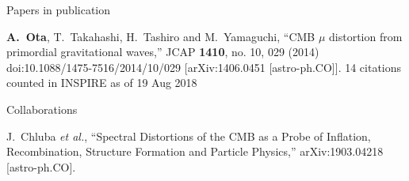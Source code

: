 \documentclass[a4paper]{resume} %
\begin{document}
\begin{rSection}{Papers in publication}
\begin{etaremune}
    \item 
      {\bf A.~Ota}, T.~Takahashi, H.~Tashiro and M.~Yamaguchi,
  ``CMB $\mu$ distortion from primordial gravitational waves,''
  JCAP {\bf 1410}, no. 10, 029 (2014)
  doi:10.1088/1475-7516/2014/10/029
  [arXiv:1406.0451 [astro-ph.CO]].
  14 citations counted in INSPIRE as of 19 Aug 2018
    
\end{etaremune}

\newpage
\end{rSection}


\begin{rSection}{Collaborations}


\begin{etaremune}
\item%
  J.~Chluba {\it et al.},
  ``Spectral Distortions of the CMB as a Probe of Inflation, Recombination, Structure Formation and Particle Physics,''
  arXiv:1903.04218 [astro-ph.CO].
\end{etaremune}






\end{rSection}
\end{document}
